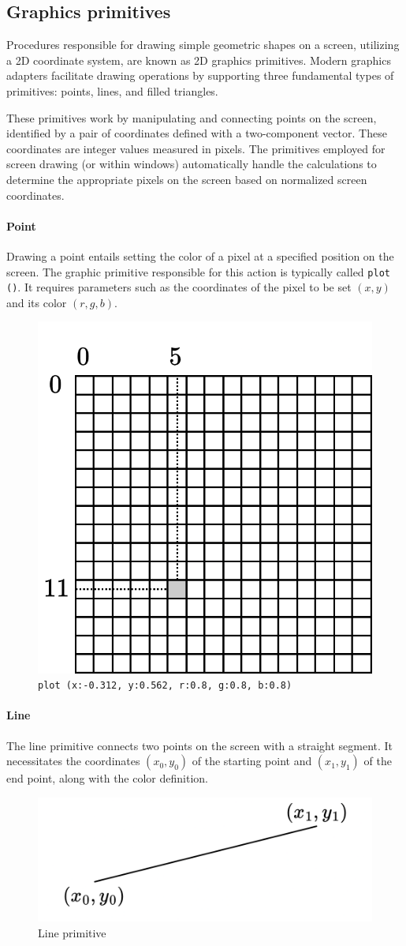 \subsection{Graphics primitives}
Procedures responsible for drawing simple geometric shapes on a screen, utilizing a 2D coordinate system, are known as 2D graphics primitives.
Modern graphics adapters facilitate drawing operations by supporting three fundamental types of primitives: points, lines, and filled triangles.

These primitives work by manipulating and connecting points on the screen, identified by a pair of coordinates defined with a two-component vector. 
These coordinates are integer values measured in pixels.
The primitives employed for screen drawing (or within windows) automatically handle the calculations to determine the appropriate pixels on the screen based on normalized screen coordinates.

\paragraph*{Point}
Drawing a point entails setting the color of a pixel at a specified position on the screen. 
The graphic primitive responsible for this action is typically called \texttt{plot ()}. 
It requires parameters such as the coordinates of the pixel to be set $(x,y)$ and its color $(r,g,b)$.
\begin{figure}[H]
    \centering
    \includegraphics[width=0.35\linewidth]{images/plot.png}
    \caption{\texttt{plot (x:-0.312, y:0.562, r:0.8, g:0.8, b:0.8)}}
\end{figure}

\paragraph*{Line}
The line primitive connects two points on the screen with a straight segment. 
It necessitates the coordinates $(x_0,y_0)$ of the starting point and $(x_1,y_1)$ of the end point, along with the color definition.
\begin{figure}[H]
    \centering
    \includegraphics[width=0.4\linewidth]{images/line.png}
    \caption{Line primitive}
\end{figure}

